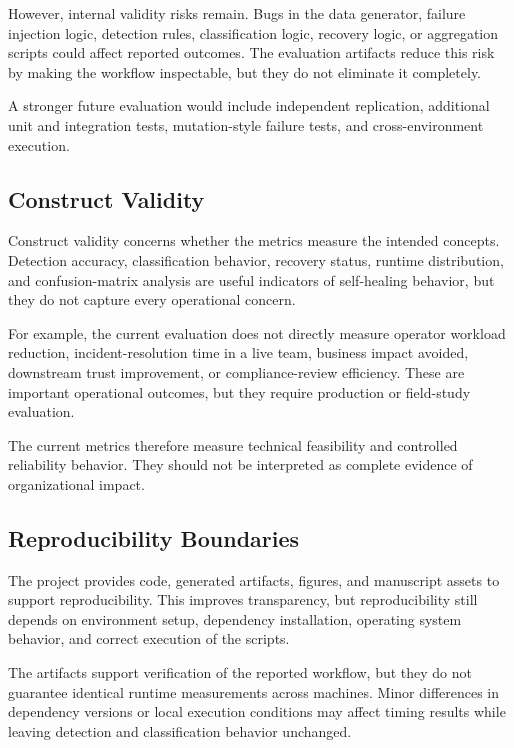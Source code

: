 However, internal validity risks remain. Bugs in the data generator, failure injection logic, detection rules, classification logic, recovery logic, or aggregation scripts could affect reported outcomes. The evaluation artifacts reduce this risk by making the workflow inspectable, but they do not eliminate it completely.

A stronger future evaluation would include independent replication, additional unit and integration tests, mutation-style failure tests, and cross-environment execution.

\subsection{Construct Validity}

Construct validity concerns whether the metrics measure the intended concepts. Detection accuracy, classification behavior, recovery status, runtime distribution, and confusion-matrix analysis are useful indicators of self-healing behavior, but they do not capture every operational concern.

For example, the current evaluation does not directly measure operator workload reduction, incident-resolution time in a live team, business impact avoided, downstream trust improvement, or compliance-review efficiency. These are important operational outcomes, but they require production or field-study evaluation.

The current metrics therefore measure technical feasibility and controlled reliability behavior. They should not be interpreted as complete evidence of organizational impact.

\subsection{Reproducibility Boundaries}

The project provides code, generated artifacts, figures, and manuscript assets to support reproducibility. This improves transparency, but reproducibility still depends on environment setup, dependency installation, operating system behavior, and correct execution of the scripts.

The artifacts support verification of the reported workflow, but they do not guarantee identical runtime measurements across machines. Minor differences in dependency versions or local execution conditions may affect timing results while leaving detection and classification behavior unchanged.

